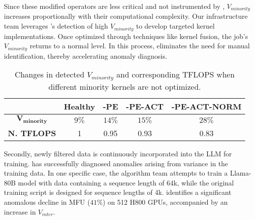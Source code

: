 Since these modified operators are less critical and not instrumented by \sysname{}, $V_{minority}$ increases proportionally with their computational complexity.
Our infrastructure team leverages \sysname{}’s detection of high $V_{minority}$ to develop targeted kernel implementations. Once optimized through techniques like kernel fusion, the job’s $V_{minority}$ returns to a normal level. In this process, \sysname{} eliminates the need for manual identification, thereby accelerating anomaly diagnosis.


\begin{table}
\footnotesize
\centering
\caption{Changes in detected $V_{minority}$ and corresponding TFLOPS when different minority kernels are not optimized.}
\label{tb:void-minority}
\begin{tabular}{c|c|c|c|c}
\hline
                        & \textbf{Healthy} & \textbf{-PE} & \textbf{-PE-ACT} & \textbf{-PE-ACT-NORM} \\ \hline
$\mathbf{V_{minority}}$ & $9\%$           & $14\%$       & $15\%$           & $28\%$                \\ \hline
\textbf{N. TFLOPS}      & 1               & 0.95         & 0.93             & 0.83                  \\ \hline
\end{tabular}
\vspace{-4mm}
\end{table}

Secondly, newly filtered data is continuously incorporated into the LLM for training. \sysname{} has successfully diagnosed anomalies arising from variance in the training data. In one specific case, the algorithm team attempts to train a Llama-80B model with data containing a sequence length of 64k, while the original training script is designed for sequence lengths of 4k. \sysname{} identifies a significant anomalous decline in MFU ($41\%$) on 512 H800 GPUs, accompanied by an increase in $V_{inter}$.

